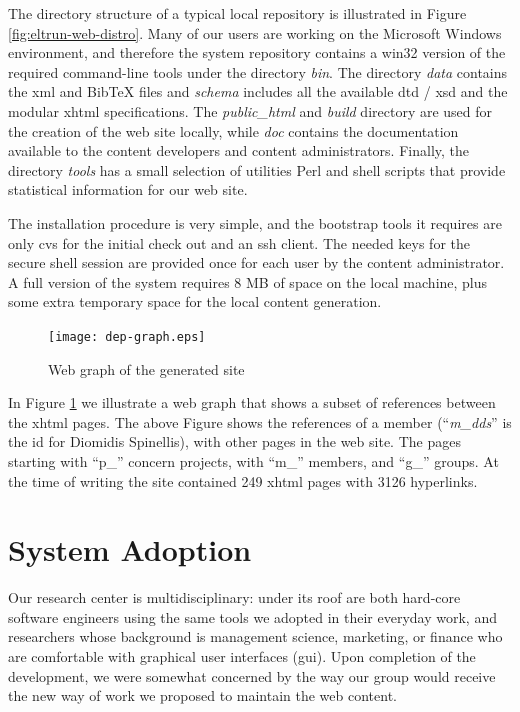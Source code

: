 \documentclass{article}
\begin{document}
The directory structure of a typical 
local repository is illustrated in Figure \ref{fig:eltrun-web-distro}.
Many of our users are working on the Microsoft Windows environment, and
therefore the system repository contains a {\sc win32} version of the required
command-line tools under the directory \textit{bin}.
The directory \textit{data} contains the {\sc xml} and {\sc BibTeX} files and \textit{schema}
includes all the available {\sc dtd / xsd} and the modular {\sc xhtml} specifications.
The \textit{public\_html} and \textit{build} directory are used for the creation of the 
web site locally, while \textit{doc} contains the documentation available to
the content developers and content administrators.
Finally, the directory \textit{tools} has a small selection 
of utilities Perl and shell scripts that provide statistical information
for our web site.

The installation procedure is very simple,
and the bootstrap tools it requires are only {\sc cvs} for 
the initial check out and an {\sc ssh} client. The needed keys 
for the secure shell session are provided once for each user by the content administrator. 
A full version of the system requires 8 MB of space 
on the local machine, plus some extra temporary space for the local content generation.

\begin{figure}
\texttt{[image: dep-graph.eps]}
\caption{Web graph of the generated site}
\label{fig:eltrun-web-m-dds-snapshot}
\end{figure}

In Figure \ref{fig:eltrun-web-m-dds-snapshot} we illustrate a web graph \cite{KRRSTU00} 
that shows a subset of references between the {\sc xhtml} pages.
The above Figure shows the references  of a member (``\textit{m\_dds}'' is the {\sc id} for 
Diomidis Spinellis), with other pages in the web site.
The pages starting with ``p\_'' concern projects, with ``m\_'' members, and ``g\_'' groups.
At the time of writing the site contained 249 {\sc xhtml} pages with 3126 hyperlinks. 

\section{System Adoption}
\label{sec:adopt}

Our research center is multidisciplinary: under its roof
are both hard-core software engineers using the same tools
we adopted in their everyday work, and researchers whose
background is management science, marketing, or finance
who are comfortable with graphical user interfaces ({\sc gui}).
Upon completion of the development, we were somewhat concerned by the way our group
would receive the new way of work we proposed to maintain the web content.
\end{document}
